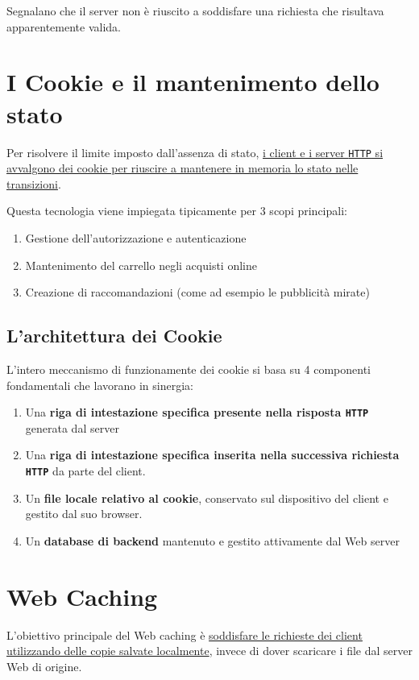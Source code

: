 Segnalano che il server non è riuscito a soddisfare una richiesta che risultava apparentemente valida.

\section{I Cookie e il mantenimento dello stato}
Per risolvere il limite imposto dall'assenza di stato, \uline{i client e i server \texttt{HTTP} si avvalgono dei cookie per riuscire a mantenere in memoria lo stato nelle transizioni}.

Questa tecnologia viene impiegata tipicamente per 3 scopi principali:

\begin{enumerate}
    \item Gestione dell'autorizzazione e autenticazione
    \item Mantenimento del carrello negli acquisti online
    \item Creazione di raccomandazioni (come ad esempio le pubblicità mirate)
\end{enumerate}

\subsection{L'architettura dei Cookie}
L'intero meccanismo di funzionamente dei cookie si basa su 4 componenti fondamentali che lavorano in sinergia: 

\begin{enumerate}
    \item Una \textbf{riga di intestazione specifica presente nella risposta \texttt{HTTP}} generata dal server
    \item Una \textbf{riga di intestazione specifica inserita nella successiva richiesta \texttt{HTTP}} da parte del client.
    \item Un \textbf{file locale relativo al cookie}, conservato sul dispositivo del client e gestito dal suo browser.
    \item Un \textbf{database di backend} mantenuto e gestito attivamente dal Web server
\end{enumerate}

\section{Web Caching}
L'obiettivo principale del Web caching è \uline{soddisfare le richieste dei client utilizzando delle copie salvate localmente}, invece di dover scaricare i file dal server Web di origine.

